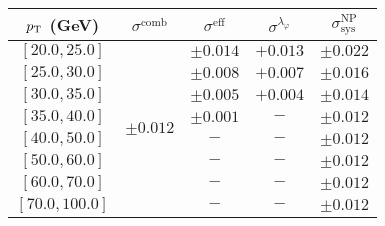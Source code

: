 \begin{tabular}{c||c|c|c||c}
$p_\text{T}$ (GeV) & $\sigma^{\text{comb}}$ & $\sigma^{\text{eff}}$ & $\sigma^{\lambda_\varphi}$ & $\sigma_{\text{sys}}^{\text{NP}}$ \\
\hline
$[20.0, 25.0]$ & \multirow{8}{*}{$\pm0.012$} & $\pm0.014$ & $+0.013$ & $\pm0.022$\\
$[25.0, 30.0]$ &  & $\pm0.008$ & $+0.007$ & $\pm0.016$\\
$[30.0, 35.0]$ &  & $\pm0.005$ & $+0.004$ & $\pm0.014$\\
$[35.0, 40.0]$ &  & $\pm0.001$ & $-$ & $\pm0.012$\\
$[40.0, 50.0]$ &  & $-$ & $-$ & $\pm0.012$\\
$[50.0, 60.0]$ &  & $-$ & $-$ & $\pm0.012$\\
$[60.0, 70.0]$ &  & $-$ & $-$ & $\pm0.012$\\
$[70.0, 100.0]$ &  & $-$ & $-$ & $\pm0.012$\\
\end{tabular}
